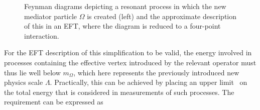 \begin{figure}
\begin{subfigure}{.4\textwidth}
    \centering
\end{subfigure}%
\begin{subfigure}{.2\textwidth}
    \centering
\end{subfigure}
\begin{subfigure}{.4\textwidth}
    \centering
\end{subfigure}
\caption{Feynman diagrams depicting a resonant process in which the new mediator particle $\Omega$ is created (left) and the approximate description of this in an EFT, where the diagram is reduced to a four-point interaction.}
\label{fig:EFTMediatorToFourPoint}
\end{figure}%
For the EFT description of this simplification to be valid, the energy involved in processes containing the effective vertex introduced by the relevant operator must thus lie well below $m_{\Omega}$, which here represents the previously introduced new physics scale $\Lambda$. Practically, this can be achieved by placing an upper limit \mcut \, on the total energy that is considered in measurements of such processes. The requirement can be expressed as
